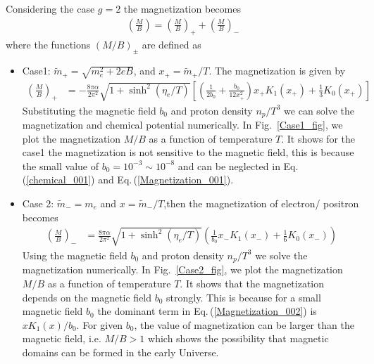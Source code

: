 \documentclass[universe,article,submit,moreauthors,pdftex,a4paper]{Definitions/mdpi}
\newcommand{\req}[1]{Eq.\,(\ref{#1})}
\newcommand*{\rf}[1]{Fig.~{\ref{#1}}}
\begin{document}
Considering the case $g=2$ the magnetization becomes
\begin{align}
\left(\frac{M}{B}\right)=\left(\frac{M}{B}\right)_++\left(\frac{M}{B}\right)
_-
\end{align}
where the functions $(M/B)_\pm$ are defined as 
\begin{itemize}
  \item Case1: $\tilde m_+=\sqrt{m^2_e+2eB}$, and $x_+=\tilde m_+/T$. The magnetization is given by
  \begin{align}\label{Magnetization_001}
 \left(\frac{M}{B}\right)_+&=-\frac{8\pi\alpha}{2\pi^2}\sqrt{1+\sinh^2(\eta_e/T)}\left[\left(\frac{1}{2b_0}+\frac{b_0}{12x_+^2}\right)x_+K_1(x_+)+\frac{1}{3}K_0(x_+)\right]
   \end{align}
Substituting the magnetic field $b_0$ and proton density $n_p/T^3$  we can solve the magnetization and chemical potential numerically. In \rf{Case1_fig}, we plot the  magnetization $M/B$ as a function of temperature $T$. It shows for the case1 the magnetization is not sensitive to the magnetic field, this is because the small value of $b_0=10^{-3}\sim10^{-8}$ and can be neglected in \req{chemical_001} and \req{Magnetization_001}.
\\
  \item Case 2: $\tilde m_-=m_e$ and $x=\tilde m_-/T$,then the magnetization of electron/ positron becomes
\begin{align}\label{Magnetization_002}
\left(\frac{M}{B}\right)_-&=\frac{8\pi\alpha}{2\pi^2}\sqrt{1+\sinh^2(\eta_e/T)}\left(\frac{1}{b_0}x_-K_1(x_-)+\frac{1}{6}K_0(x_-)\right)
\end{align}
Using the magnetic field $b_0$ and proton density $n_p/T^3$ we solve the magnetization  numerically. In \rf{Case2_fig}, we plot the  magnetization $M/B$ as a function of temperature $T$. It shows that the magnetization depends on the magnetic field $b_0$ strongly. This is because for a small magnetic field $b_0$ the dominant term in \req{Magnetization_002} is $xK_1(x)/b_0$. For given $b_0$, the value of magnetization can be larger than the magnetic field, i.e. $M/B>1$  which shows the possibility that magnetic domains can be formed in the early Universe.
\end{itemize}

\end{document}
